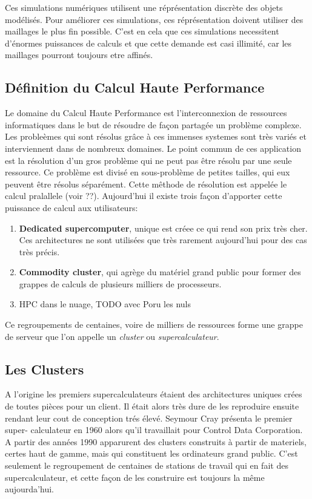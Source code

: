 Ces simulations numériques utilisent une réprésentation discrète des objets modélisés. Pour améliorer ces simulations, ces réprésentation doivent utiliser des maillages le plus fin possible. C'est en cela que ces simulations necessitent d'énormes puissances de calculs et que cette demande est casi illimité, car les maillages pourront toujours etre affinés. 



\subsection{Définition du Calcul Haute Performance}
 
Le domaine du Calcul Haute Performance est l'interconnexion de ressources informatiques dans le but de résoudre de façon partagée un problème complexe. Les probleèmes qui sont résolus grâce à ces immenses systemes sont très variés et interviennent dans de nombreux domaines. Le point commun de ces application est la résolution d'un gros problème qui ne peut pas être résolu par une seule ressource. Ce problème est divisé en sous-problème de petites tailles, qui eux peuvent être résolus séparément. Cette mêthode de résolution est appelée le calcul pralallele (voir ??). 
Aujourd'hui il existe trois façon d'apporter cette puissance de calcul aux utilisateurs:
\begin{enumerate}
\item \textbf{Dedicated supercomputer}, unique est créee ce qui rend son prix très cher. Ces architectures ne sont utilisées que très rarement aujourd'hui pour des cas très précis.
\item \textbf{Commodity cluster}, qui agrège du matériel grand public pour former des grappes de calculs de plusieurs milliers de processeurs.
\item HPC dans le nuage, TODO avec Poru les nuls
\end{enumerate}

Ce regroupements de centaines, voire de milliers de ressources forme une grappe de serveur que l'on appelle un \textit{cluster} ou \textit{supercalculateur}.


\subsection{Les Clusters}
A l'origine les premiers supercalculateurs étaient des architectures uniques crées de toutes pièces pour un client. Il était alors très dure de les reproduire ensuite rendant leur cout de conception trés élevé. Seymour Cray présenta le premier super- calculateur en 1960 alors qu'il travaillait pour Control Data Corporation. A partir des années 1990 apparurent des clusters construits à partir de materiels, certes haut de gamme, mais qui constituent les ordinateurs grand public. C'est seulement le regroupement de centaines de stations de travail qui en fait des supercalculateur, et cette façon de les construire est toujours la même aujourda'hui.

